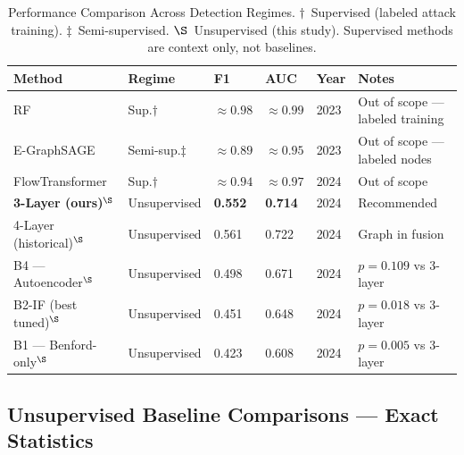 \documentclass[journal,10pt,twoside]{IEEEtran}
\begin{document}
\begin{table}[t]
\caption{Performance Comparison Across Detection Regimes.
  $\dagger$~Supervised (labeled attack training).
  $\ddagger$~Semi-supervised.
  $\S$~Unsupervised (this study).
  Supervised methods are context only, not baselines.}
\label{tab:comparison}
\centering\small
\begin{tabular}{@{}L{2.9cm}L{1.75cm}P{0.75cm}P{0.8cm}P{0.65cm}
                   L{3.8cm}@{}}
\toprule
\textbf{Method} & \textbf{Regime} & \textbf{F1}
  & \textbf{AUC} & \textbf{Year} & \textbf{Notes} \\
\midrule
RF~\cite{park2023rf}
  & Sup.$\dagger$  & ${\approx}0.98$ & ${\approx}0.99$
  & 2023 & Out of scope --- labeled training \\
E-GraphSAGE~\cite{lo2023egraphsage}
  & Semi-sup.$\ddagger$ & ${\approx}0.89$ & ${\approx}0.95$
  & 2023 & Out of scope --- labeled nodes \\
FlowTransformer~\cite{xliu2024flowtransformer}
  & Sup.$\dagger$  & ${\approx}0.94$ & ${\approx}0.97$
  & 2024 & Out of scope \\
\textbf{3-Layer (ours)}$^{\S}$
  & Unsupervised   & \textbf{0.552} & \textbf{0.714}
  & 2024 & Recommended \\
4-Layer (historical)$^{\S}$
  & Unsupervised   & 0.561 & 0.722 & 2024 & Graph in fusion \\
B4 --- Autoencoder$^{\S}$
  & Unsupervised   & 0.498 & 0.671 & 2024 & $p{=}0.109$ vs 3-layer \\
B2-IF (best tuned)$^{\S}$
  & Unsupervised   & 0.451 & 0.648 & 2024 & $p{=}0.018$ vs 3-layer \\
B1 --- Benford-only$^{\S}$
  & Unsupervised   & 0.423 & 0.608 & 2024 & $p{=}0.005$ vs 3-layer \\
\bottomrule
\end{tabular}
\end{table}

\subsection{Unsupervised Baseline Comparisons --- Exact Statistics}
\end{document}
